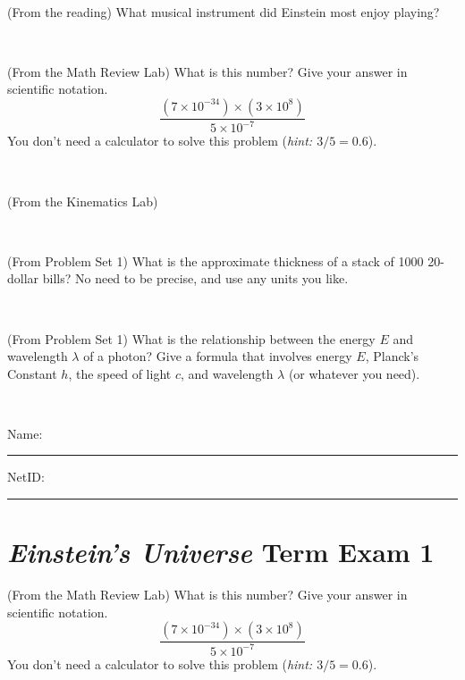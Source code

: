 \documentclass[12pt, letterpaper]{article}
\begin{document}
\vfill ~

\begin{problem} (From the reading)
What musical instrument did Einstein most enjoy playing?
\end{problem}


\vfill ~


\clearpage


\begin{problem} (From the Math Review Lab)
What is this number? Give your answer in scientific notation.
$$
\frac{(7\times10^{-34})\times(3\times10^8)}{5\times10^{-7}}
$$
You don't need a calculator to solve this problem (\textit{hint: $3/5=0.6$}).
\end{problem}


\vfill ~

\begin{problem} (From the Kinematics Lab)

\end{problem}


\vfill ~

\begin{problem} (From Problem Set 1)
What is the approximate thickness of a stack of 1000 20-dollar bills?
No need to be precise, and use any units you like.
\end{problem}


\vfill ~

\begin{problem} (From Problem Set 1)
What is the relationship between the energy $E$ and wavelength
$\lambda$ of a photon? Give a formula that involves energy $E$,
Planck's Constant $h$, the speed of light $c$, and wavelength
$\lambda$ (or whatever you need).
\end{problem}

\vfill ~


\cleardoublepage



\noindent
Name: \rule[-1ex]{0.60\textwidth}{0.1pt}
NetID: \rule[-1ex]{0.20\textwidth}{0.1pt}

\section*{\textsl{Einstein's Universe} Term Exam 1}
\setcounter{problem}{1}


\begin{problem} (From the Math Review Lab)
What is this number? Give your answer in scientific notation.
$$
\frac{(7\times10^{-34})\times(3\times10^8)}{5\times10^{-7}}
$$
You don't need a calculator to solve this problem (\textit{hint: $3/5=0.6$}).
\end{problem}
\end{document}
